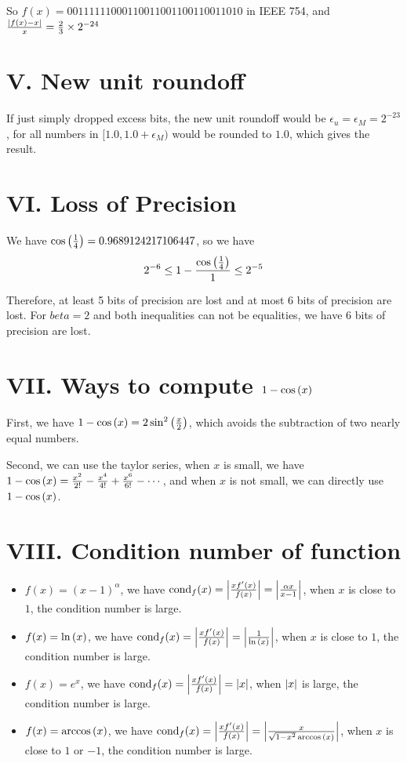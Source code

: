 \documentclass[a4paper]{article}
\begin{document}
So $f(x) = 00111111000110011001100110011010$ in IEEE 754, and $\frac{\abs{f(x) - x}}{x} = \frac{2}{3} \times 2^{-24}$

\section*{V. New unit roundoff}

If just simply dropped excess bits, the new unit roundoff would be $\epsilon_u = \epsilon_M = 2^{-23}$, for all numbers in $[1.0, 1.0+\epsilon_M)$ would be rounded to $1.0$, which gives the result. 

\section*{VI. Loss of Precision}

We have $\cos\qty(\frac{1}{4}) = 0.9689124217106447$, so we have
\begin{equation}
   2^{-6} \leq 1 - \frac{\cos\qty(\frac{1}{4})}{1} \leq 2^{-5}
\end{equation}

Therefore, at least 5 bits of precision are lost and at most 6 bits of precision are lost. For $beta=2$ and both inequalities can not be equalities, we have $6$ bits of precision are lost.

\section*{VII. Ways to compute $1-\cos\qty(x)$}

First, we have $1-\cos\qty(x) = 2\sin^2\qty(\frac{x}{2})$, which avoids the subtraction of two nearly equal numbers.

Second, we can use the taylor series, when $x$ is small, we have $1-\cos\qty(x) = \frac{x^2}{2!} - \frac{x^4}{4!} + \frac{x^6}{6!} - \cdots$, and when $x$ is not small, we can directly use $1-\cos\qty(x)$.


\section*{VIII. Condition number of function}

\begin{itemize}
    \item $f(x) = (x-1)^{\alpha}$, we have $\mathrm{cond}_f(x) = \abs{\frac{x f^\prime(x)}{f(x)}} = \abs{\frac{\alpha x}{x-1}}$, when $x$ is close to $1$, the condition number is large.
    \item $f(x) = \ln\qty(x)$, we have $\mathrm{cond}_f(x) = \abs{\frac{x f^\prime(x)}{f(x)}} = \abs{\frac{1}{\ln\qty(x)}}$, when $x$ is close to $1$, the condition number is large.
    \item $f(x) = e^x$, we have $\mathrm{cond}_f(x) = \abs{\frac{x f^\prime(x)}{f(x)}} = \abs{x}$, when $\abs{x}$ is large, the condition number is large.
    \item $f(x) = \arccos\qty(x)$, we have $\mathrm{cond}_f(x) = \abs{\frac{x f^\prime(x)}{f(x)}} = \abs{\frac{x}{\sqrt{1-x^2} \arccos\qty(x)}}$, when $x$ is close to $1$ or $-1$, the condition number is large.
\end{itemize}
\end{document}
